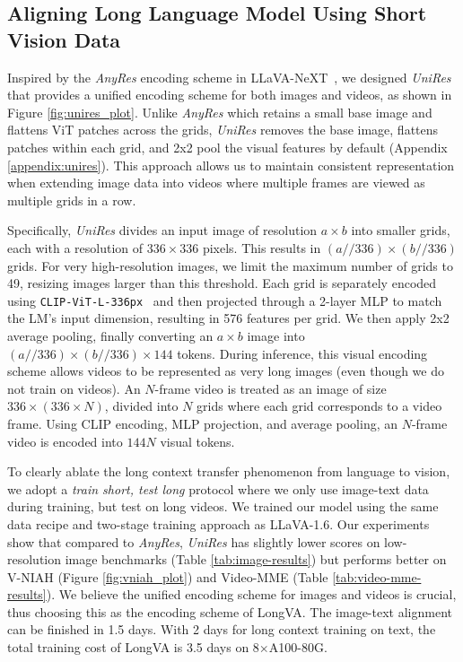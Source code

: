 \subsection{Aligning Long Language Model Using Short Vision Data}
\label{sec:vl-alignment}

 Inspired by the \textit{AnyRes} encoding scheme in LLaVA-NeXT~\citep{liu2024llavanext, li2024llavanext-ablations}, we designed \textit{UniRes} that provides a unified encoding scheme for both images and videos, as shown in Figure \ref{fig:unires_plot}. Unlike \textit{AnyRes} which retains a small base image and flattens ViT patches across the grids, \textit{UniRes} removes the base image, flattens patches within each grid, and 2x2 pool the visual features by default (Appendix \ref{appendix:unires}). This approach allows us to maintain consistent representation when extending image data into videos where multiple frames are viewed as multiple grids in a row. 
 
 Specifically, \textit{UniRes} divides an input image of resolution $a \times b$ into smaller grids, each with a resolution of $336 \times 336$ pixels. This results in $(a//336) \times (b//336)$ grids. For very high-resolution images, we limit the maximum number of grids to 49, resizing images larger than this threshold. Each grid is separately encoded using \texttt{CLIP-ViT-L-336px}~\citep{radford2021learning} and then projected through a 2-layer MLP to match the LM's input dimension, resulting in 576 features per grid. We then apply 2x2 average pooling, finally converting an $a \times b$ image into $(a//336) \times (b//336) \times 144$ tokens. During inference, this visual encoding scheme allows videos to be represented as very long images (even though we do not train on videos). An $N$-frame video is treated as an image of size $336 \times (336 \times N)$, divided into $N$ grids where each grid corresponds to a video frame. Using CLIP encoding, MLP projection, and average pooling, an $N$-frame video is encoded into $144N$ visual tokens. 

To clearly ablate the long context transfer phenomenon from language to vision, we adopt a \textit{train short, test long} protocol where we only use image-text data during training, but test on long videos. We trained our model using the same data recipe and two-stage training approach as LLaVA-1.6. Our experiments show that compared to \textit{AnyRes}, \textit{UniRes} has slightly lower scores on low-resolution image benchmarks (Table \ref{tab:image-results}) but performs better on V-NIAH (Figure \ref{fig:vniah_plot}) and Video-MME (Table \ref{tab:video-mme-results}). We believe the unified encoding scheme for images and videos is crucial, thus choosing this as the encoding scheme of LongVA. The image-text alignment can be finished in 1.5 days. With 2 days for long context training on text, the total training cost of LongVA is 3.5 days on 8$\times$A100-80G.


